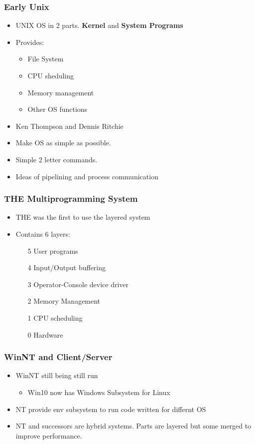 \documentclass{article}
\begin{document}
	\subsubsection{Early Unix}
		\begin{itemize}
			\item UNIX OS in 2 parts. \textbf{Kernel} and \textbf{System Programs}
			\item Provides:
				\begin{itemize}
					\item File System
					\item CPU sheduling
					\item Memory management
					\item Other OS functions
				\end{itemize}
			\item Ken Thompson and Dennis Ritchie
			\item Make OS as simple as possible.
			\item Simple 2 letter commands.
			\item Ideas of pipelining and process communication
		\end{itemize}

	\subsubsection{THE Multiprogramming System}
		\begin{itemize}
			\item THE was the first to use the layered system
			\item Contains 6 layers:
				\begin{enumerate}
					\item[5] User programs
					\item[4] Input/Output buffering
					\item[3] Operator-Console device driver
					\item[2] Memory Management
					\item[1] CPU scheduling
					\item[0] Hardware
				\end{enumerate}
		\end{itemize}

	\subsubsection{WinNT and Client/Server}
		\begin{itemize}
			\item WinNT still being still run
				\begin{itemize}
					\item Win10 now has Windows Subsystem for Linux
				\end{itemize}
			\item NT provide env subsystem to run code written for differnt OS
			\item NT and successors are hybrid systems. Parts are layered but some merged to improve performance.
		\end{itemize}
		
\end{document}
